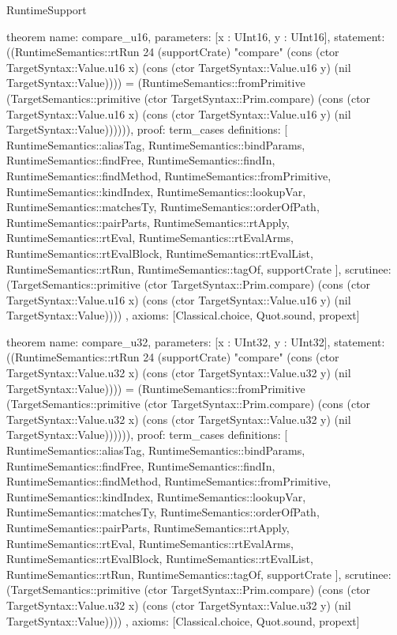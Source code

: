 \begin{lexlean}{RuntimeSupport}
\begin{semanticmodule}
theorem{
  name: compare_u16,
  parameters: [x : UInt16, y : UInt16],
  statement: ((RuntimeSemantics::rtRun 24 (supportCrate) "compare" (cons (ctor TargetSyntax::Value.u16 x) (cons (ctor TargetSyntax::Value.u16 y) (nil TargetSyntax::Value)))) = (RuntimeSemantics::fromPrimitive (TargetSemantics::primitive (ctor TargetSyntax::Prim.compare) (cons (ctor TargetSyntax::Value.u16 x) (cons (ctor TargetSyntax::Value.u16 y) (nil TargetSyntax::Value)))))),
  proof: term_cases{
    definitions: [
      RuntimeSemantics::aliasTag,
      RuntimeSemantics::bindParams,
      RuntimeSemantics::findFree,
      RuntimeSemantics::findIn,
      RuntimeSemantics::findMethod,
      RuntimeSemantics::fromPrimitive,
      RuntimeSemantics::kindIndex,
      RuntimeSemantics::lookupVar,
      RuntimeSemantics::matchesTy,
      RuntimeSemantics::orderOfPath,
      RuntimeSemantics::pairParts,
      RuntimeSemantics::rtApply,
      RuntimeSemantics::rtEval,
      RuntimeSemantics::rtEvalArms,
      RuntimeSemantics::rtEvalBlock,
      RuntimeSemantics::rtEvalList,
      RuntimeSemantics::rtRun,
      RuntimeSemantics::tagOf,
      supportCrate
    ],
    scrutinee: (TargetSemantics::primitive (ctor TargetSyntax::Prim.compare) (cons (ctor TargetSyntax::Value.u16 x) (cons (ctor TargetSyntax::Value.u16 y) (nil TargetSyntax::Value))))
  },
  axioms: [Classical.choice, Quot.sound, propext]
}

theorem{
  name: compare_u32,
  parameters: [x : UInt32, y : UInt32],
  statement: ((RuntimeSemantics::rtRun 24 (supportCrate) "compare" (cons (ctor TargetSyntax::Value.u32 x) (cons (ctor TargetSyntax::Value.u32 y) (nil TargetSyntax::Value)))) = (RuntimeSemantics::fromPrimitive (TargetSemantics::primitive (ctor TargetSyntax::Prim.compare) (cons (ctor TargetSyntax::Value.u32 x) (cons (ctor TargetSyntax::Value.u32 y) (nil TargetSyntax::Value)))))),
  proof: term_cases{
    definitions: [
      RuntimeSemantics::aliasTag,
      RuntimeSemantics::bindParams,
      RuntimeSemantics::findFree,
      RuntimeSemantics::findIn,
      RuntimeSemantics::findMethod,
      RuntimeSemantics::fromPrimitive,
      RuntimeSemantics::kindIndex,
      RuntimeSemantics::lookupVar,
      RuntimeSemantics::matchesTy,
      RuntimeSemantics::orderOfPath,
      RuntimeSemantics::pairParts,
      RuntimeSemantics::rtApply,
      RuntimeSemantics::rtEval,
      RuntimeSemantics::rtEvalArms,
      RuntimeSemantics::rtEvalBlock,
      RuntimeSemantics::rtEvalList,
      RuntimeSemantics::rtRun,
      RuntimeSemantics::tagOf,
      supportCrate
    ],
    scrutinee: (TargetSemantics::primitive (ctor TargetSyntax::Prim.compare) (cons (ctor TargetSyntax::Value.u32 x) (cons (ctor TargetSyntax::Value.u32 y) (nil TargetSyntax::Value))))
  },
  axioms: [Classical.choice, Quot.sound, propext]
}


\end{semanticmodule}
\end{lexlean}
